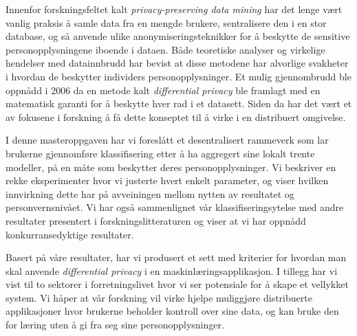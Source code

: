 \noindent 
Innenfor forskningsfeltet kalt \textit{privacy-preserving data mining} har det lenge v{\ae}rt vanlig praksis {\aa} samle data fra en mengde brukere, sentralisere den i en stor database, og s{\aa} anvende ulike anonymiseringsteknikker for {\aa} beskytte de sensitive personopplysningene iboende i dataen. B{\aa}de teoretiske analyser og virkelige hendelser med datainnbrudd har bevist at disse metodene har alvorlige svakheter i hvordan de beskytter individers personopplysninger. Et mulig gjennombrudd ble oppn{\aa}dd i 2006 da en metode kalt \textit{differential privacy} ble framlagt med en matematisk garanti for {\aa} beskytte hver rad i et datasett. Siden da har det v{\ae}rt et av fokusene i forskning {\aa} f{\aa} dette konseptet til {\aa} virke i en distribuert omgivelse.

I denne masteroppgaven har vi foresl{\aa}tt et desentralisert rammeverk som lar brukerne gjennomf{\o}re klassifisering etter {\aa} ha aggregert sine lokalt trente modeller, p{\aa} en m{\aa}te som beskytter deres personopplysninger. Vi beskriver en rekke eksperimenter hvor vi justerte hvert enkelt parameter, og viser hvilken innvirkning dette har p{\aa} avveiningen mellom nytten av resultatet og personvernsniv{\aa}et. Vi har ogs{\aa} sammenlignet v{\aa}r klassifiseringsytelse med andre resultater presentert i forskningslitteraturen og viser at vi har oppn{\aa}dd konkurransedyktige resultater.     

Basert p{\aa} v{\aa}re resultater, har vi produsert et sett med kriterier for hvordan man skal anvende \textit{differential privacy} i en maskinl{\ae}ringsapplikasjon. I tillegg har vi vist til to sektorer i forretningslivet hvor vi ser potensiale for {\aa} skape et 
vellykket system. Vi h{\aa}per at v{\aa}r forskning vil virke hjelpe muliggj{\o}re distribuerte applikasjoner hvor brukerne beholder kontroll over sine data, og kan bruke den for l{\ae}ring uten {\aa} gi fra seg sine personopplysninger.   

\cleardoublepage